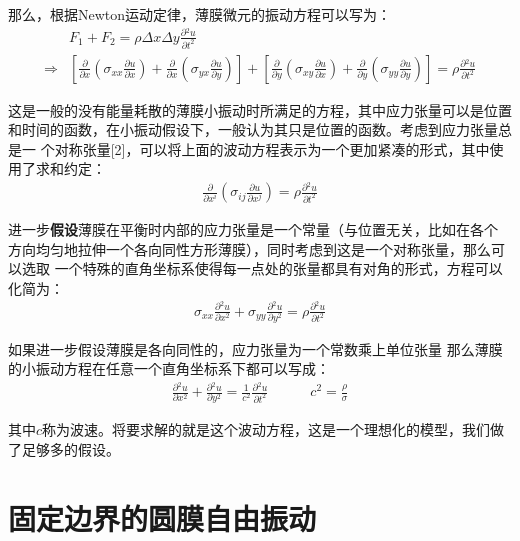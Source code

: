 \documentclass[a4paper]{ctexart}
\newcommand{\pdv}[2]{\frac{\partial{#1}}{\partial{#2}}}
\begin{document}
	\par 那么，根据Newton运动定律，薄膜微元的振动方程可以写为：
	\begin{align}
		&F_{1} + F_{2} = \rho \Delta x\Delta y \pdv{^{2}u}{t^{2}}\\
		\Rightarrow& \left[\pdv{}{x}\left(\sigma_{xx}\pdv{u}{x}\right) + \pdv{}{x}\left(\sigma_{yx}\pdv{u}{y}\right)\right] + 
		\left[\pdv{}{y}\left(\sigma_{xy}\pdv{u}{x}\right) + \pdv{}{y}\left(\sigma_{yy}\pdv{u}{y}\right)\right] = \rho\pdv{^2 u}{t^{2}}
	\end{align}
	\par 这是一般的没有能量耗散的薄膜小振动时所满足的方程，其中应力张量可以是位置
	和时间的函数，在小振动假设下，一般认为其只是位置的函数。考虑到应力张量总是一
	个对称张量[2]，可以将上面的波动方程表示为一个更加紧凑的形式，其中使用了求和约定：
	\begin{align}
		\pdv{}{x^{i}}\left(\sigma_{ij}\pdv{u}{x^{j}}\right) = \rho\pdv{^2 u}{t^2}
	\end{align}
	
	进一步\textbf{假设}薄膜在平衡时内部的应力张量是一个常量（与位置无关，比如在各个
	方向均匀地拉伸一个各向同性方形薄膜），同时考虑到这是一个对称张量，那么可以选取
	一个特殊的直角坐标系使得每一点处的张量都具有对角的形式，方程可以化简为：
	\begin{align}
		\sigma_{xx}\pdv{^{2}u}{x^{2}} + \sigma_{yy}\pdv{^2 u}{y^2} = \rho \pdv{^{2}u}{t^{2}}
	\end{align}
	\par 如果进一步假设薄膜是各向同性的，应力张量为一个常数乘上单位张量
	那么薄膜的小振动方程在任意一个直角坐标系下都可以写成：
	\begin{align}
		\pdv{^2 u}{x^2} + \pdv{^{2}u}{y^{2}} = \frac{1}{c^{2}}\pdv{^2 u}{t^2}\quad\quad\quad c^2 = \frac{\rho}{\sigma}
	\end{align}
	\par 其中$c$称为波速。将要求解的就是这个波动方程，这是一个理想化的模型，我们做了足够多的假设。
	\section{固定边界的圆膜自由振动}
\end{document}
